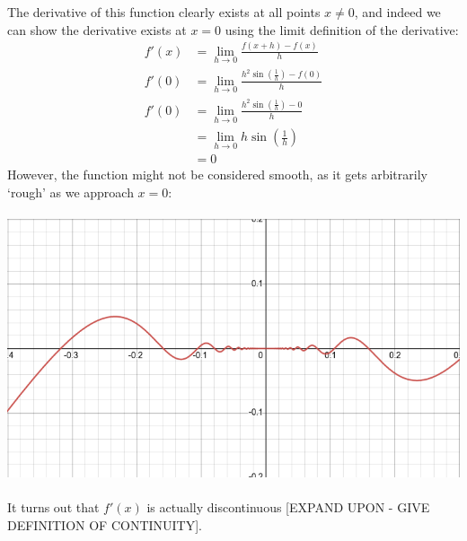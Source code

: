 \documentclass{article}
\begin{document}
The derivative of this function clearly exists at all points $x \neq 0$, and indeed we can
show the derivative exists at $x=0$ using the limit definition of the derivative:
\begin{align*}
f'(x) & = \lim_{h \to 0} \frac{f(x+h) - f(x)}{h}
\\
f'(0) & = \lim_{h \to 0} \frac{h^2 \sin(\frac{1}{h}) - f(0)}{h}
\\
f'(0) & = \lim_{h \to 0} \frac{h^2 \sin(\frac{1}{h}) - 0}{h}
\\
& = \lim_{h \to 0} h \sin(\frac{1}{h})
\\
& = 0
\end{align*}
However, the function might not be considered smooth, as it gets arbitrarily `rough' as we
approach $x=0$:
\\\\
\includegraphics[width=\textwidth]{discon_deriv.png}
\\\\
It turns out that $f'(x)$ is actually discontinuous [EXPAND UPON - GIVE DEFINITION OF CONTINUITY].
\end{document}
